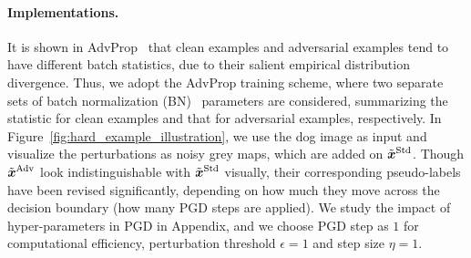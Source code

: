 \documentclass[10pt,twocolumn,letterpaper]{article}
\newcommand{\xv}{\boldsymbol{x}}
\begin{document}
\paragraph{Implementations.} It is shown in AdvProp~\cite{xie2020adversarial} that clean examples and adversarial examples tend to have different batch statistics, due to their salient empirical distribution divergence. Thus, we adopt the AdvProp training scheme, where two separate sets of batch normalization (BN)~\cite{ioffe2015batch} parameters are considered, summarizing the statistic for clean examples and that for adversarial examples, respectively. In Figure~\ref{fig:hard_example_illustration}, we use the dog image as input and visualize the perturbations as noisy grey maps, which are added on $\Tilde{\xv}^{\text{Std}}$. Though $\Tilde{\xv}^{\text{Adv}}$ look indistinguishable with $\Tilde{\xv}^{\text{Std}}$ visually, their corresponding pseudo-labels have been revised significantly, depending on how much they move across the decision boundary (\ie how many PGD steps are applied). We study the impact of hyper-parameters in PGD in Appendix, and we choose PGD step as $1$ for computational efficiency, perturbation threshold $\epsilon=1$ and step size $ \eta =1$.  
\end{document}
